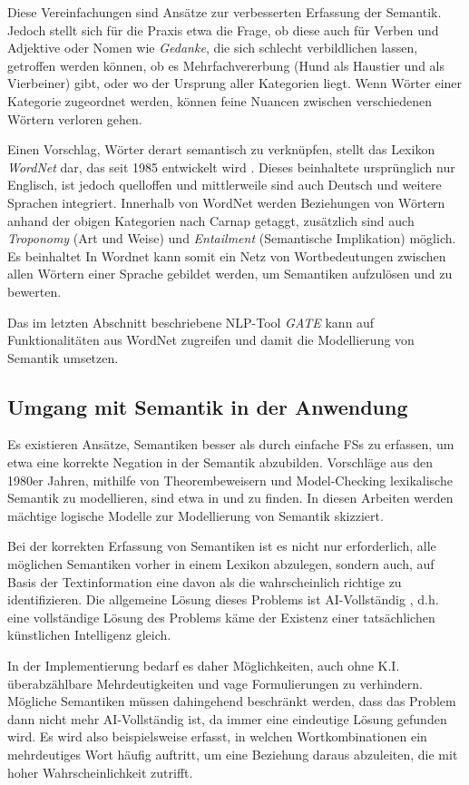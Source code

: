 \documentclass[12pt]{report}
\begin{document}
Diese Vereinfachungen sind Ansätze zur verbesserten Erfassung der Semantik.  Jedoch stellt sich für die Praxis etwa die Frage, ob diese auch für Verben und Adjektive oder Nomen wie \textit{\glqq  Gedanke\grqq{}}, die sich schlecht verbildlichen lassen, getroffen werden können, ob es \glqq  Mehrfachvererbung\grqq{} (Hund als Haustier und als Vierbeiner) gibt, oder wo der Ursprung aller Kategorien liegt. Wenn Wörter einer Kategorie zugeordnet werden, können feine Nuancen zwischen verschiedenen Wörtern verloren gehen. 

Einen Vorschlag, Wörter derart semantisch zu verknüpfen, stellt das Lexikon \textit{WordNet} dar, das seit 1985 entwickelt wird \cite{mil95}. Dieses beinhaltete ursprünglich nur Englisch, ist jedoch quelloffen und mittlerweile sind auch Deutsch und weitere Sprachen integriert. Innerhalb von WordNet werden Beziehungen von Wörtern anhand der obigen Kategorien nach Carnap getaggt, zusätzlich sind auch \textit{Troponomy} (Art und Weise) und \textit{Entailment} (Semantische Implikation) möglich. Es beinhaltet In Wordnet kann somit ein Netz von Wortbedeutungen zwischen allen Wörtern einer Sprache gebildet werden, um Semantiken aufzulösen und zu bewerten. 

Das im letzten Abschnitt beschriebene NLP-Tool \textit{GATE} kann auf Funktionalitäten aus WordNet zugreifen und damit die Modellierung von Semantik umsetzen.

\subsection{Umgang mit Semantik in der Anwendung}
Es existieren Ansätze, Semantiken besser als durch einfache FSs zu erfassen, um etwa eine korrekte Negation in der Semantik abzubilden. Vorschläge aus den 1980er Jahren, mithilfe von Theorembeweisern und Model-Checking lexikalische Semantik zu modellieren, sind etwa in \cite{sb88} und \cite{kn85} zu finden. In diesen Arbeiten werden mächtige logische Modelle zur Modellierung von Semantik skizziert. 

Bei der korrekten Erfassung von Semantiken ist es nicht nur erforderlich, alle möglichen Semantiken vorher in einem Lexikon abzulegen, sondern auch, auf Basis der Textinformation eine davon als die wahrscheinlich richtige zu identifizieren. Die allgemeine Lösung dieses Problems ist AI-Vollständig \cite{cop04}, d.h. eine vollständige Lösung des Problems käme der Existenz einer tatsächlichen künstlichen Intelligenz gleich. 

In der Implementierung bedarf es daher Möglichkeiten, auch ohne K.I. überabzählbare Mehrdeutigkeiten und vage Formulierungen zu verhindern. Mögliche Semantiken müssen dahingehend beschränkt werden, dass das Problem dann nicht mehr AI-Vollständig ist, da immer eine eindeutige Lösung gefunden wird. Es wird also beispielsweise erfasst, in welchen Wortkombinationen ein mehrdeutiges Wort häufig auftritt, um eine Beziehung daraus abzuleiten, die mit hoher Wahrscheinlichkeit zutrifft. 
\end{document}
